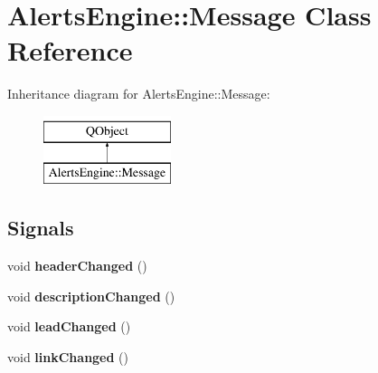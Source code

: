 \hypertarget{classAlertsEngine_1_1Message}{}\section{Alerts\+Engine\+:\+:Message Class Reference}
\label{classAlertsEngine_1_1Message}
Inheritance diagram for Alerts\+Engine\+:\+:Message\+:\begin{figure}[H]
\begin{center}
\leavevmode
\includegraphics[height=2.000000cm]{classAlertsEngine_1_1Message}
\end{center}
\end{figure}
\subsection*{Signals}
\begin{DoxyCompactItemize}
\item 
\mbox{\label{classAlertsEngine_1_1Message_a3473a72eeb26ff623481efc13018c846}} 
void {\bfseries header\+Changed} ()
\item 
\mbox{\label{classAlertsEngine_1_1Message_a0064ac8f44048fd34f1c53a7d64af58f}} 
void {\bfseries description\+Changed} ()
\item 
\mbox{\label{classAlertsEngine_1_1Message_af268d538b313ac7f625c98de03d6389f}} 
void {\bfseries lead\+Changed} ()
\item 
\mbox{\label{classAlertsEngine_1_1Message_a6010da9ca6fd506cb12b2b4ba9459aeb}} 
void {\bfseries link\+Changed} ()
\end{DoxyCompactItemize}
